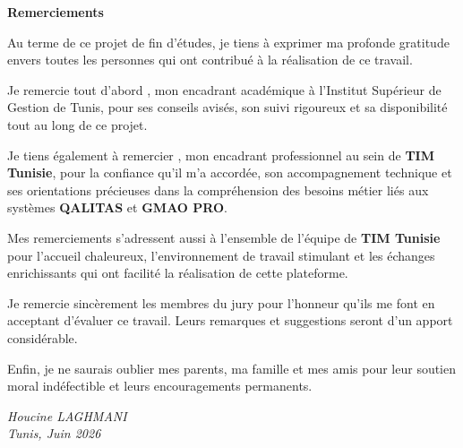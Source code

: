 
\newpage
\thispagestyle{empty}

\begin{center}
{\Large\textbf{Remerciements}}
\end{center}

\vspace{1.5cm}

Au terme de ce projet de fin d'études, je tiens à exprimer ma profonde gratitude envers toutes les personnes qui ont contribué à la réalisation de ce travail.

\vspace{0.5cm}

Je remercie tout d'abord \textbf{\underline{\hspace{4cm}}}, mon encadrant académique à l'Institut Supérieur de Gestion de Tunis, pour ses conseils avisés, son suivi rigoureux et sa disponibilité tout au long de ce projet.

\vspace{0.5cm}

Je tiens également à remercier \textbf{\underline{\hspace{4cm}}}, mon encadrant professionnel au sein de \textbf{TIM Tunisie}, pour la confiance qu'il m'a accordée, son accompagnement technique et ses orientations précieuses dans la compréhension des besoins métier liés aux systèmes \textbf{QALITAS} et \textbf{GMAO PRO}.

\vspace{0.5cm}

Mes remerciements s'adressent aussi à l'ensemble de l'équipe de \textbf{TIM Tunisie} pour l'accueil chaleureux, l'environnement de travail stimulant et les échanges enrichissants qui ont facilité la réalisation de cette plateforme.

\vspace{0.5cm}

Je remercie sincèrement les membres du jury pour l'honneur qu'ils me font en acceptant d'évaluer ce travail. Leurs remarques et suggestions seront d'un apport considérable.

\vspace{0.5cm}

Enfin, je ne saurais oublier mes parents, ma famille et mes amis pour leur soutien moral indéfectible et leurs encouragements permanents.

\vspace{1cm}

\begin{flushright}
\textit{Houcine LAGHMANI}\\
\textit{Tunis, Juin 2026}
\end{flushright}

\newpage
